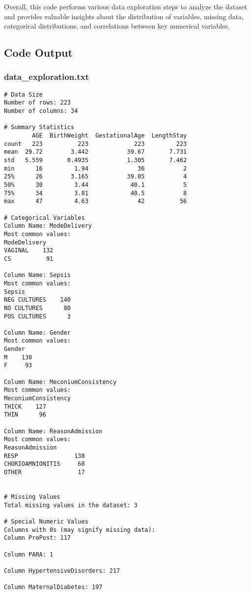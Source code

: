 \documentclass[11pt]{article}
\begin{document}
Overall, this code performs various data exploration steps to analyze the dataset and provides valuable insights about the distribution of variables, missing data, categorical distributions, and correlations between key numerical variables.

\subsection{Code Output}

\subsubsection*{data\_exploration.txt}

\begin{Verbatim}[tabsize=4]
# Data Size
Number of rows: 223
Number of columns: 34

# Summary Statistics
        AGE  BirthWeight  GestationalAge  LengthStay
count   223          223             223         223
mean  29.72        3.442           39.67       7.731
std   5.559       0.4935           1.305       7.462
min      16         1.94              36           2
25%      26        3.165           39.05           4
50%      30         3.44            40.1           5
75%      34         3.81            40.5           8
max      47         4.63              42          56

# Categorical Variables
Column Name: ModeDelivery
Most common values:
ModeDelivery
VAGINAL    132
CS          91

Column Name: Sepsis
Most common values:
Sepsis
NEG CULTURES    140
NO CULTURES      80
POS CULTURES      3

Column Name: Gender
Most common values:
Gender
M    130
F     93

Column Name: MeconiumConsistency
Most common values:
MeconiumConsistency
THICK    127
THIN      96

Column Name: ReasonAdmission
Most common values:
ReasonAdmission
RESP                138
CHORIOAMNIONITIS     68
OTHER                17


# Missing Values
Total missing values in the dataset: 3

# Special Numeric Values
Columns with 0s (may signify missing data):
Column PrePost: 117

Column PARA: 1

Column HypertensiveDisorders: 217

Column MaternalDiabetes: 197


\end{Verbatim}
\end{document}
